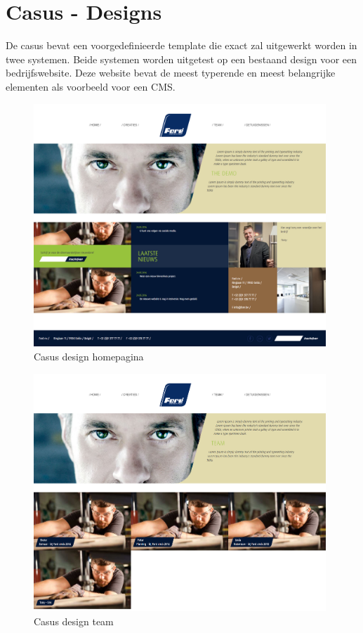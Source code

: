 \chapter{Casus - Designs}
\label{AppendixDesigns}

De casus bevat een voorgedefinieerde template die exact zal uitgewerkt worden in twee systemen. Beide systemen worden uitgetest op een bestaand design voor een bedrijfswebsite. Deze website bevat de meest typerende en meest belangrijke elementen als voorbeeld voor een CMS.

\begin{figure}[!ht]
  \includegraphics[width=110mm]{img/design-01.png}
  \centering
  \caption{Casus design homepagina}
  \label{fig:Casus design homepagina}
\end{figure}

\begin{figure}[!ht]
  \includegraphics[width=110mm]{img/design-02.png}
  \centering
  \caption{Casus design team}
  \label{fig:Casus design team}
\end{figure}

